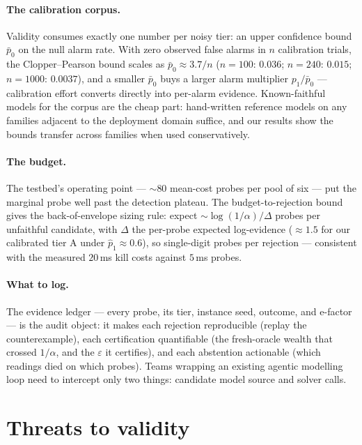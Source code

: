 \documentclass[pdflatex,sn-mathphys-num]{sn-jnl}
\theoremstyle{thmstyleone}
\theoremstyle{thmstyletwo}
\begin{document}
\paragraph{The calibration corpus.} Validity consumes exactly one
number per noisy tier: an upper confidence bound $\bar p_0$ on the
null alarm rate. With zero observed false alarms in $n$ calibration
trials, the Clopper--Pearson bound scales as
$\bar p_0 \approx 3.7/n$ ($n{=}100$: $0.036$; $n{=}240$: $0.015$;
$n{=}1000$: $0.0037$), and a smaller $\bar p_0$ buys a larger alarm
multiplier $p_1/\bar p_0$ --- calibration effort converts directly
into per-alarm evidence. Known-faithful models for the corpus are the
cheap part: hand-written reference models on any families adjacent to
the deployment domain suffice, and our results show the bounds
transfer across families when used conservatively.

\paragraph{The budget.} The testbed's operating point --- ${\sim}80$
mean-cost probes per pool of six --- put the marginal probe well past
the detection plateau. The budget-to-rejection bound gives the
back-of-envelope sizing rule: expect
${\sim}\log(1/\alpha)/\Delta$ probes per unfaithful candidate, with
$\Delta$ the per-probe expected log-evidence (${\approx}1.5$ for our
calibrated tier A under $\hat p_1 \approx 0.6$), so single-digit
probes per rejection --- consistent with the measured $20$\,ms kill
costs against $5$\,ms probes.

\paragraph{What to log.} The evidence ledger --- every probe, its
tier, instance seed, outcome, and e-factor --- is the audit object:
it makes each rejection reproducible (replay the counterexample),
each certification quantifiable (the fresh-oracle wealth that crossed
$1/\alpha$, and the $\varepsilon$ it certifies), and each abstention actionable (which readings died on
which probes). Teams wrapping an existing agentic modelling loop
\cite{szeider2025cpagent, szeider2025mcp} need to intercept only two
things: candidate model source and solver calls.

\section{Threats to validity}\label{sec:threats}
\end{document}
